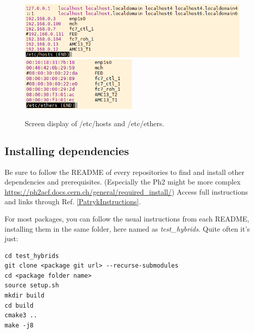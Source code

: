 \documentclass[10pt,a4paper]{article}
\begin{document}
\begin{figure}[h!]
\centering
        \includegraphics[width=\textwidth]{hosts.png}
        \includegraphics[width=0.5\textwidth]{ethers.png}
  \caption{Screen display of /etc/hosts and /etc/ethers.}
  \label{GoodHosts}
\end{figure}

\newpage 

\subsection{Installing dependencies}

Be sure to follow the README of every repositories to find and install other dependencies and prerequisites.
(Especially the Ph2 might be more complex \url{https://ph2acf.docs.cern.ch/general/required_install/})
Access full instructions and links through Ref. \ref{PatrykInstructions}. 

For most packages, you can follow the usual instructions from each README, installing them in the same folder, here named as \emph{test\_hybrids}.
Quite often it’s just:

\begin{framed}
\begin{verbatim}
cd test_hybrids
git clone <package git url> --recurse-submodules
cd <package folder name>
source setup.sh
mkdir build
cd build
cmake3 ..
make -j8
\end{verbatim}
\end{framed}
\end{document}

